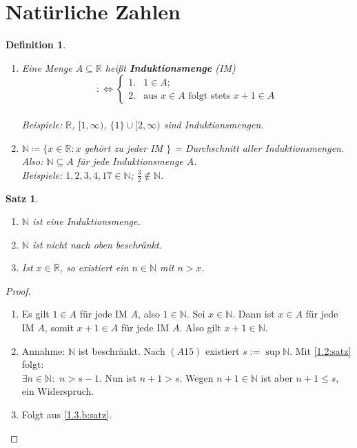 \documentclass[12pt]{extreport} %
\newcommand{\N}{\mathbb{N}}
\newcommand{\R}{\mathbb{R}}
\theoremstyle{named}
\theoremstyle{itshape}
\newtheorem{satz}[unnamedtheorem]{Satz}
\newtheorem*{definition}{Definition}
\theoremstyle{normal}
\begin{document}
\section*{Natürliche Zahlen} 

 
\begin{definition} ~\
	\begin{enumerate}
		\item Eine Menge $A \subseteq \R$ hei{\ss}t \textbf{Induktionsmenge} (IM)
		$$ :\iff \begin{cases}1 . & 1 \in A; \\ 2. & \text{aus } x \in A \text{ folgt stets } x + 1 \in A \end{cases}$$ \\
		Beispiele: $\R$, $[1, \infty)$, $\{ 1 \} \cup [2, \infty)$ sind Induktionsmengen. 
		\item $\N \coloneqq \{ x \in \R : x$ gehört zu jeder IM $\}$ = Durchschnitt aller Induktionsmengen. \\
			Also: $\N \subseteq A$ für jede Induktionsmenge $A$. \\
			Beispiele: $1,2,3,4,17 \in \N$; $\frac{3}{2} \notin \N$.
	\end{enumerate}	
\end{definition}

\begin{satz} ~\ \label{1.3:satz}
	\begin{enumerate}
		\item $\N$ ist eine Induktionsmenge.
		\item $\N$ ist nicht nach oben beschränkt.\label{1.3.b:satz}
		\item Ist $x \in \R$, so existiert ein $n \in \N$ mit $n > x$. \label{1.3.c:satz}
	\end{enumerate}
\end{satz}

\begin{proof} ~\
	\begin{enumerate}
	        \item Es gilt $1 \in A$ für jede IM $A$, also $1 \in \N$. Sei $x \in \N$. Dann ist $x \in A$ für jede IM $A$, somit
	               $x+1 \in A$ für jede IM $A$. Also gilt $x+1 \in \N$.
	        \item Annahme: $\N$ ist beschränkt. Nach $(A15)$ existiert $s:=\sup \N$. Mit \ref{1.2:satz} folgt:\\
	               $\exists n \in \N:$ $n>s-1$. Nun ist $n+1 > s$. Wegen $n+1 \in \N$ ist aber $n+1 \le s$, ein Widerspruch.
	        \item Folgt aus \ref{1.3.b:satz}.
	\end{enumerate}
\end{proof}
\end{document}
